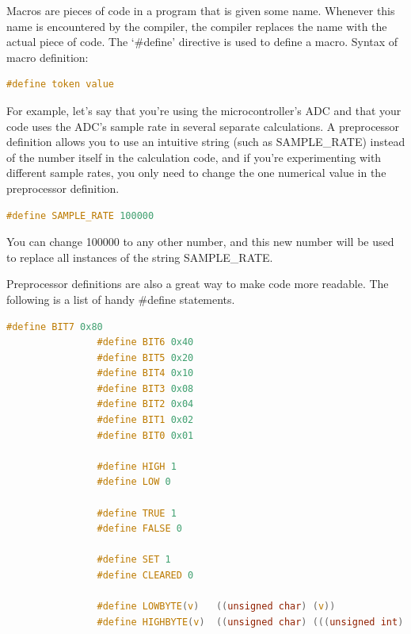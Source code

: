          Macros are pieces of code in a program that is given some name. Whenever this name is encountered by the compiler, the compiler replaces the name with the actual piece of code. The ‘\#define’ directive is used to define a macro. Syntax of macro definition:

         \begin{lstlisting}[style=mystyle_c, language=c, breaklines]
                #define token value
        \end{lstlisting}
    
    
        For example, let’s say that you’re using the microcontroller’s ADC and that your code uses the ADC’s sample rate in several separate calculations. A preprocessor definition allows you to use an intuitive string (such as SAMPLE\_RATE) instead of the number itself in the calculation code, and if you’re experimenting with different sample rates, you only need to change the one numerical value in the preprocessor definition.
    
            \begin{lstlisting}[style=mystyle_c, language=c, breaklines]
                #define SAMPLE_RATE 100000
            \end{lstlisting}
        
        You can change 100000 to any other number, and this new number will be used to replace all instances of the string SAMPLE\_RATE.

        Preprocessor definitions are also a great way to make code more readable. The following is a list of handy \#define statements.
     
            \begin{lstlisting}[style=mystyle_c, language=c, breaklines]
                #define BIT7 0x80
                #define BIT6 0x40
                #define BIT5 0x20
                #define BIT4 0x10
                #define BIT3 0x08
                #define BIT2 0x04
                #define BIT1 0x02 
                #define BIT0 0x01
                
                #define HIGH 1
                #define LOW 0
                
                #define TRUE 1
                #define FALSE 0
                
                #define SET 1
                #define CLEARED 0
                
                #define LOWBYTE(v)   ((unsigned char) (v))
                #define HIGHBYTE(v)  ((unsigned char) (((unsigned int) (v)) >> 8))
            \end{lstlisting}

